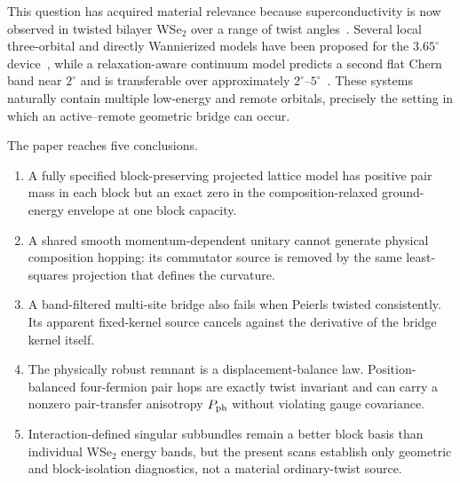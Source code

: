 \documentclass[11pt]{article}
\theoremstyle{remark}
\begin{document}
This question has acquired material relevance because superconductivity is now observed in twisted bilayer WSe$_2$ over a range of twist angles~\cite{xia2025,guo2026}.  Several local three-orbital and directly Wannierized models have been proposed for the $3.65^\circ$ device~\cite{kim2025,tuo2025}, while a relaxation-aware continuum model predicts a second flat Chern band near $2^\circ$ and is transferable over approximately $2^\circ$--$5^\circ$~\cite{zhang2025}.  These systems naturally contain multiple low-energy and remote orbitals, precisely the setting in which an active--remote geometric bridge can occur.

The paper reaches five conclusions.
\begin{enumerate}
\item A fully specified block-preserving projected lattice model has positive pair mass in each block but an exact zero in the composition-relaxed ground-energy envelope at one block capacity.
\item A shared smooth momentum-dependent unitary cannot generate physical composition hopping: its commutator source is removed by the same least-squares projection that defines the curvature.
\item A band-filtered multi-site bridge also fails when Peierls twisted consistently.  Its apparent fixed-kernel source cancels against the derivative of the bridge kernel itself.
\item The physically robust remnant is a displacement-balance law.  Position-balanced four-fermion pair hops are exactly twist invariant and can carry a nonzero pair-transfer anisotropy $P_{\rm ph}$ without violating gauge covariance.
\item Interaction-defined singular subbundles remain a better block basis than individual WSe$_2$ energy bands, but the present scans establish only geometric and block-isolation diagnostics, not a material ordinary-twist source.
\end{enumerate}
\end{document}
